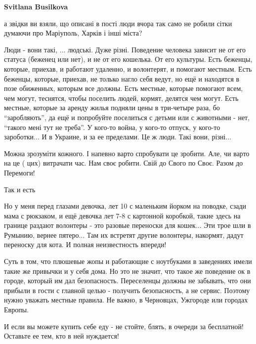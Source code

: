 \begin{itemize}
\textbf{Svitlana Busilkova} 

а звідки ви взяли, що описані в пості люди вчора так само не робили сітки
думаючи про Маріуполь, Харків і інші міста?


Люди - вони такі, ... людські. Дуже різні. Поведение человека зависит не от его
статуса (беженец или нет), и не от его кошелька. От его культуры. Есть беженцы,
которые, приехав, и работают удаленно, и волонтерят, и помогают местным. Есть
беженцы, которые, приехав, не только нагло себя ведут, но ещё и находятся в
позе обиженных, которым все должны. Есть местные, которые помогают всем, чем
могут, теснятся, чтобы поселить людей, кормят, делятся чем могут. Есть местные,
которые за аренду жилья подняли цены в три-четыре раза, бо
\enquote{заробляють}, да ещё и попробуйте поселиться с детьми или с животными -
нет, \enquote{такого мені тут не треба}. У кого-то война, у кого-то отпуск, у
кого-то зароботки... И в Украине, и за ее пределами. Це ж люди. Такі вони,
різні...


\obeycr
Можна зрозуміти кожного.
І напевно варто спробувати це зробити.
Але, чи варто на це ( цих) витрачати час.
Нам своє робити.
Свій до Свого по Своє.
Разом до Перемоги!
\restorecr


Так и есть

Но у меня перед глазами девочка, лет 10 с маленьким йорком на поводке, сзади
мама с рюкзаком, и ещё девочка лет 7-8 с картонной коробкой, такие здесь на
границе раздают волонтеры - это разовые переноски для кошек... Эти трое шли в
Румынию, вернее пятеро... Там их встретят другие волонтеры, накормят, дадут
переноску для кота. И полная неизвестность впереди!


Суть в том, что плюшевые жопы и работающие с ноутбуками в заведениях имели
такие же привычки и у себя дома. Но это не значит, что такое же поведение ок в
городе, который им дал безопасность. Переселенцы должны не забывать, что они
прибыли в гости с главной целью - получить безопасность, а не сервис. Поэтому
нужно уважать местные правила. Не важно, в Черновцах, Ужгороде или городах
Европы.


И если вы можете купить себе еду - не стойте, блять, в очереди за бесплатной!
Оставьте ее тем, кто в ней нуждается!


\end{itemize}
